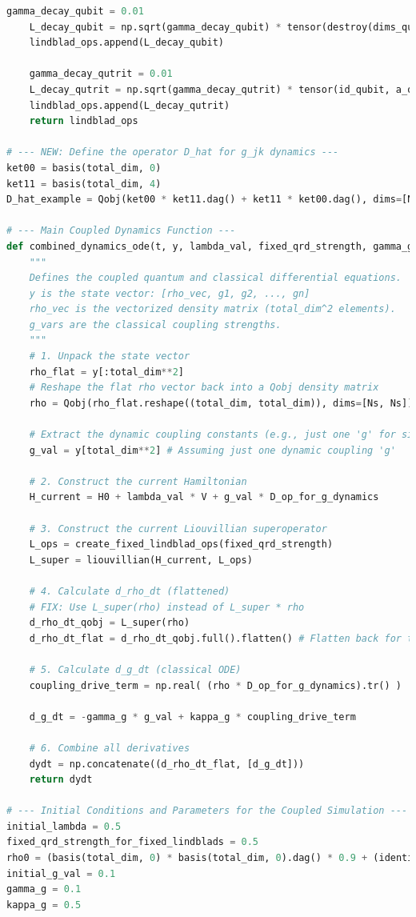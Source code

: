 \documentclass[9pt]{article}
\begin{document}
\begin{lstlisting}[language=Python, basicstyle=\ttfamily\footnotesize, breaklines=true, frame=single, caption={Python Code for Emergence of Endogenous Dynamics}, label={lst:qrd_code}]
    gamma_decay_qubit = 0.01
    L_decay_qubit = np.sqrt(gamma_decay_qubit) * tensor(destroy(dims_qubit), id_qutrit)
    lindblad_ops.append(L_decay_qubit)

    gamma_decay_qutrit = 0.01
    L_decay_qutrit = np.sqrt(gamma_decay_qutrit) * tensor(id_qubit, a_qt)
    lindblad_ops.append(L_decay_qutrit)
    return lindblad_ops

# --- NEW: Define the operator D_hat for g_jk dynamics ---
ket00 = basis(total_dim, 0)
ket11 = basis(total_dim, 4)
D_hat_example = Qobj(ket00 * ket11.dag() + ket11 * ket00.dag(), dims=[Ns, Ns]) # FIX from last error

# --- Main Coupled Dynamics Function ---
def combined_dynamics_ode(t, y, lambda_val, fixed_qrd_strength, gamma_g, kappa_g, D_op_for_g_dynamics):
    """
    Defines the coupled quantum and classical differential equations.
    y is the state vector: [rho_vec, g1, g2, ..., gn]
    rho_vec is the vectorized density matrix (total_dim^2 elements).
    g_vars are the classical coupling strengths.
    """
    # 1. Unpack the state vector
    rho_flat = y[:total_dim**2]
    # Reshape the flat rho vector back into a Qobj density matrix
    rho = Qobj(rho_flat.reshape((total_dim, total_dim)), dims=[Ns, Ns])
    
    # Extract the dynamic coupling constants (e.g., just one 'g' for simplicity initially)
    g_val = y[total_dim**2] # Assuming just one dynamic coupling 'g'

    # 2. Construct the current Hamiltonian
    H_current = H0 + lambda_val * V + g_val * D_op_for_g_dynamics
    
    # 3. Construct the current Liouvillian superoperator
    L_ops = create_fixed_lindblad_ops(fixed_qrd_strength)
    L_super = liouvillian(H_current, L_ops)

    # 4. Calculate d_rho_dt (flattened)
    # FIX: Use L_super(rho) instead of L_super * rho
    d_rho_dt_qobj = L_super(rho)
    d_rho_dt_flat = d_rho_dt_qobj.full().flatten() # Flatten back for the solver

    # 5. Calculate d_g_dt (classical ODE)
    coupling_drive_term = np.real( (rho * D_op_for_g_dynamics).tr() )

    d_g_dt = -gamma_g * g_val + kappa_g * coupling_drive_term

    # 6. Combine all derivatives
    dydt = np.concatenate((d_rho_dt_flat, [d_g_dt]))
    return dydt

# --- Initial Conditions and Parameters for the Coupled Simulation ---
initial_lambda = 0.5
fixed_qrd_strength_for_fixed_lindblads = 0.5
rho0 = (basis(total_dim, 0) * basis(total_dim, 0).dag() * 0.9 + (identity(total_dim) * 0.1 / total_dim)).unit()
initial_g_val = 0.1
gamma_g = 0.1
kappa_g = 0.5


\end{lstlisting}
\end{document}
